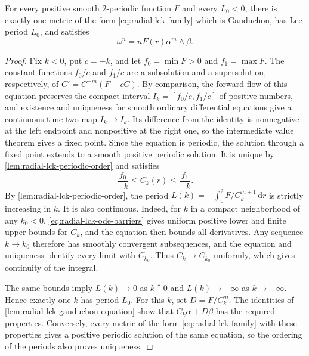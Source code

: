 \begin{theorem}\label{thm:radial-gauduchon-lck-volume}
For every positive smooth $2$-periodic function $F$ and every $L_0<0$, there is exactly one metric of the form \eqref{eq:radial-lck-family} which is Gauduchon, has Lee period $L_0$, and satisfies
\[
 \omega^n=nF(r)\alpha^m\wedge\beta.
\]
\end{theorem}
\begin{proof}
Fix $k<0$, put $c=-k$, and let $f_0=\min F>0$ and $f_1=\max F$. The constant functions $f_0/c$ and $f_1/c$ are a subsolution and a supersolution, respectively, of $C'=C^{-m}(F-cC)$. By comparison, the forward flow of this equation preserves the compact interval $I_k=[f_0/c,f_1/c]$ of positive numbers, and existence and uniqueness for smooth ordinary differential equations give a continuous time-two map $I_k\to I_k$. Its difference from the identity is nonnegative at the left endpoint and nonpositive at the right one, so the intermediate value theorem gives a fixed point. Since the equation is periodic, the solution through a fixed point extends to a smooth positive periodic solution. It is unique by \cref{lem:radial-lck-periodic-order} and satisfies
\begin{equation}\label{eq:radial-lck-ode-barriers}
 \frac{f_0}{-k}\leq C_k(r)\leq\frac{f_1}{-k}.
\end{equation}
By \cref{lem:radial-lck-periodic-order}, the period $L(k)=-\int_0^2F/C_k^{m+1}\,\mathrm dr$ is strictly increasing in $k$. It is also continuous. Indeed, for $k$ in a compact neighborhood of any $k_0<0$, \eqref{eq:radial-lck-ode-barriers} gives uniform positive lower and finite upper bounds for $C_k$, and the equation then bounds all derivatives. Any sequence $k\to k_0$ therefore has smoothly convergent subsequences, and the equation and uniqueness identify every limit with $C_{k_0}$. Thus $C_k\to C_{k_0}$ uniformly, which gives continuity of the integral.

The same bounds imply $L(k)\to0$ as $k\uparrow0$ and $L(k)\to-\infty$ as $k\to-\infty$. Hence exactly one $k$ has period $L_0$. For this $k$, set $D=F/C_k^m$. The identities of \cref{lem:radial-lck-gauduchon-equation} show that $C_k\alpha+D\beta$ has the required properties. Conversely, every metric of the form \eqref{eq:radial-lck-family} with these properties gives a positive periodic solution of the same equation, so the ordering of the periods also proves uniqueness.
\end{proof}


